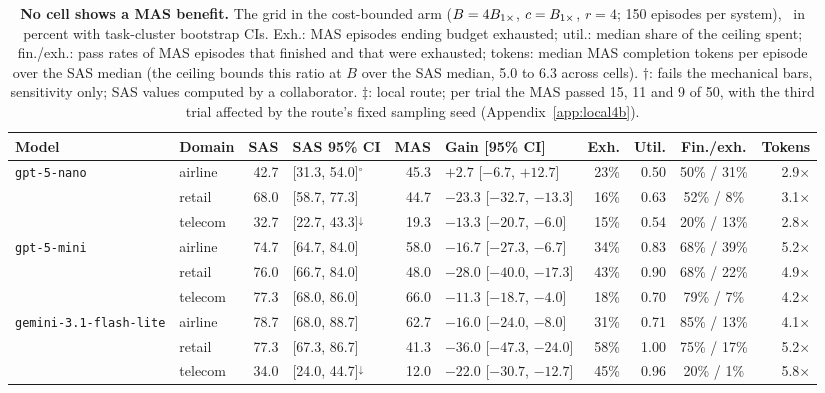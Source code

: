 \begin{table}[t]
\caption{\textbf{No cell shows a MAS benefit.} The grid in the cost-bounded arm ($B = 4B_{1\times}$, $c = B_{1\times}$, $r = 4$; 150 episodes per system), \passone\ in percent with task-cluster bootstrap CIs. Exh.: MAS episodes ending budget exhausted; util.: median share of the ceiling spent; fin./exh.: pass rates of MAS episodes that finished and that were exhausted; tokens: median MAS completion tokens per episode over the SAS median (the ceiling bounds this ratio at $B$ over the SAS median, 5.0 to 6.3 across cells). $\dagger$: fails the mechanical bars, sensitivity only; SAS values computed by a collaborator. $\ddagger$: local route; per trial the MAS passed 15, 11 and 9 of 50, with the third trial affected by the route's fixed sampling seed (Appendix~\ref{app:local4b}).}
\label{tab:cells}
\begin{center}
\scriptsize
\setlength{\tabcolsep}{2.5pt}
\begin{tabular}{@{}llrlrlrrcr@{}}
\toprule
Model & Domain & SAS & SAS 95\% CI & MAS & Gain [95\% CI] & Exh. & Util. & Fin./exh. & Tokens \\
\midrule
\texttt{gpt-5-nano} & airline & 42.7 & [31.3, 54.0]$^{\circ}$ & 45.3 & $+2.7$ [$-6.7$, $+12.7$] & 23\% & 0.50 & 50\% / 31\% & 2.9$\times$ \\
 & retail & 68.0 & [58.7, 77.3] & 44.7 & $-23.3$ [$-32.7$, $-13.3$] & 16\% & 0.63 & 52\% / 8\% & 3.1$\times$ \\
 & telecom & 32.7 & [22.7, 43.3]$^{\downarrow}$ & 19.3 & $-13.3$ [$-20.7$, $-6.0$] & 15\% & 0.54 & 20\% / 13\% & 2.8$\times$ \\
\addlinespace[2pt]
\texttt{gpt-5-mini} & airline & 74.7 & [64.7, 84.0] & 58.0 & $-16.7$ [$-27.3$, $-6.7$] & 34\% & 0.83 & 68\% / 39\% & 5.2$\times$ \\
 & retail & 76.0 & [66.7, 84.0] & 48.0 & $-28.0$ [$-40.0$, $-17.3$] & 43\% & 0.90 & 68\% / 22\% & 4.9$\times$ \\
 & telecom & 77.3 & [68.0, 86.0] & 66.0 & $-11.3$ [$-18.7$, $-4.0$] & 18\% & 0.70 & 79\% / 7\% & 4.2$\times$ \\
\addlinespace[2pt]
\texttt{gemini-3.1-flash-lite} & airline & 78.7 & [68.0, 88.7] & 62.7 & $-16.0$ [$-24.0$, $-8.0$] & 31\% & 0.71 & 85\% / 13\% & 4.1$\times$ \\
 & retail & 77.3 & [67.3, 86.7] & 41.3 & $-36.0$ [$-47.3$, $-24.0$] & 58\% & 1.00 & 75\% / 17\% & 5.2$\times$ \\
 & telecom & 34.0 & [24.0, 44.7]$^{\downarrow}$ & 12.0 & $-22.0$ [$-30.7$, $-12.7$] & 45\% & 0.96 & 20\% / 1\% & 5.8$\times$ \\

\end{tabular}
\end{center}
\end{table}
